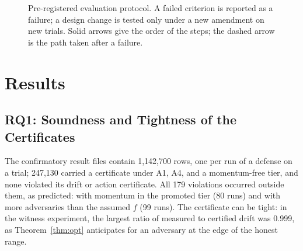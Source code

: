\documentclass[journal]{IEEEtran}
\theoremstyle{remark}
\begin{document}
\begin{figure}[!t]
\centering
{}
\caption{Pre-registered evaluation protocol. A failed criterion is reported as a failure; a design change is tested only under a new amendment on new trials. Solid arrows give the order of the steps; the dashed arrow is the path taken after a failure.}
\label{fig:protocol}
\end{figure}

\section{Results}\label{sec:results}
\subsection{RQ1: Soundness and Tightness of the Certificates}
The confirmatory result files contain 1,142,700 rows, one per run of a defense on a trial; 247,130 carried a certificate under A1, A4, and a momentum-free tier, and none violated its drift or action certificate. All 179 violations occurred outside them, as predicted: with momentum in the promoted tier (80 runs) and with more adversaries than the assumed $f$ (99 runs). The certificate can be tight: in the witness experiment, the largest ratio of measured to certified drift was 0.999, as Theorem~\ref{thm:opt} anticipates for an adversary at the edge of the honest range.
\end{document}
